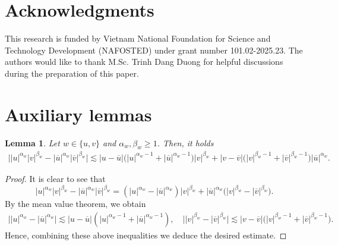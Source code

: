 \documentclass[11pt,reqno]{amsart}
\newtheorem{lemma}{Lemma}[section]
\begin{document}
	
	
	\section*{Acknowledgments}
	This research is funded by Vietnam National Foundation for Science and Technology Development (NAFOSTED) under grant number 101.02-2025.23. The authors would like to thank M.Sc. Trinh Dang Duong for helpful discussions during the preparation of this paper.
	
	\appendix 
	\section{Auxiliary lemmas}
	\begin{lemma}\label{Lem_Lipschitz}
		Let $w\in\{u,v\}$ and $\alpha_w,\beta_w\geq1$. Then, it holds
		\begin{align*}
			\big||u|^{\alpha_w}|v|^{\beta_w}-|\overline{u}|^{\alpha_w}|\overline{v}|^{\beta_w}\big|\lesssim |u-\overline{u}|\big(|u|^{\alpha_w-1}+|\overline{u}|^{\alpha_w-1}\big)|v|^{\beta_w}+|v-\overline{v}|\big(|v|^{\beta_w-1}+|\overline{v}|^{\beta_w-1}\big)|\overline{u}|^{\alpha_w}.
		\end{align*}
	\end{lemma}
	\begin{proof}
		It is clear to see that
		\begin{equation*}\label{eq_1_Lem_Lipschitz}
			|u|^{\alpha_w}|v|^{\beta_w}-|\overline{u}|^{\alpha_w}|\overline{v}|^{\beta_w}=\left(|u|^{\alpha_w}-|\overline{u}|^{\alpha_w}\right)|v|^{\beta_w}+|\overline{u}|^{\alpha_w}\big(|v|^{\beta_w}-|\overline{v}|^{\beta_w}\big).
		\end{equation*}
		By the mean value theorem, we obtain
		\begin{align*}
			\big||u|^{\alpha_w}-|\overline{u}|^{\alpha_w}\big|\lesssim |u-\overline{u}|\left(|u|^{\alpha_w-1}+|\overline{u}|^{\alpha_w-1}\right),\quad\big||v|^{\beta_w}-|\overline{v}|^{\beta_w}\big|\lesssim |v-\overline{v}|\big(|v|^{\beta_w-1}+|\overline{v}|^{\beta_w-1}\big).
		\end{align*}
		Hence, combining these above inequalities we deduce the desired estimate.
	\end{proof}
\end{document}
